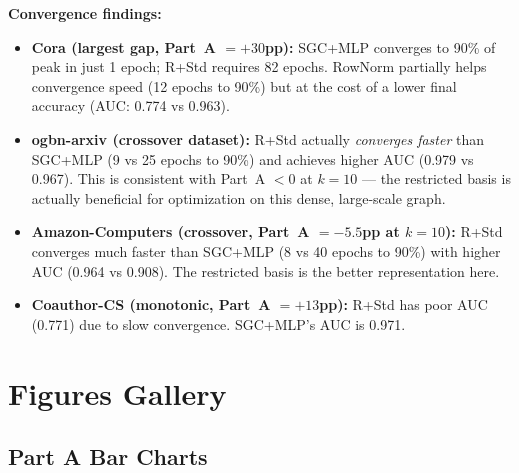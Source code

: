 \documentclass[11pt]{article}
\begin{document}
\noindent\textbf{Convergence findings:}
\begin{itemize}
  \item \textbf{Cora (largest gap, Part~A $= +30$pp):} SGC+MLP converges to 90\% of peak
    in just 1 epoch; R+Std requires 82 epochs.  RowNorm partially helps convergence speed
    (12 epochs to 90\%) but at the cost of a lower final accuracy (AUC: 0.774 vs 0.963).
  \item \textbf{ogbn-arxiv (crossover dataset):} R+Std actually \emph{converges faster}
    than SGC+MLP (9 vs 25 epochs to 90\%) and achieves higher AUC (0.979 vs 0.967).
    This is consistent with Part~A $< 0$ at $k{=}10$ --- the restricted basis is
    actually beneficial for optimization on this dense, large-scale graph.
  \item \textbf{Amazon-Computers (crossover, Part~A $= -5.5$pp at $k{=}10$):} R+Std
    converges much faster than SGC+MLP (8 vs 40 epochs to 90\%) with higher AUC
    (0.964 vs 0.908).  The restricted basis is the better representation here.
  \item \textbf{Coauthor-CS (monotonic, Part~A $= +13$pp):} R+Std has poor AUC (0.771)
    due to slow convergence.  SGC+MLP's AUC is 0.971.
\end{itemize}

\section{Figures Gallery}
\label{sec:figures}

\subsection{Part A Bar Charts}
\end{document}
